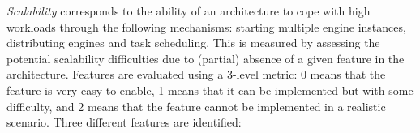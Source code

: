 \documentclass[preprint,3p,twocolumn]{elsarticle}
\newcommand{\note}[2]{\pdfmargincomment[color=yellow,author=#1,open=true]{#2}}
\newcommand{\closednote}[4]{} %
\begin{document}
\emph{Scalability} corresponds to the ability of an architecture to
cope with high workloads through the following mechanisms: starting multiple engine instances, distributing engines and task scheduling. 
This is measured by assessing the potential
scalability difficulties due to (partial) absence of a given feature in the architecture.  
Features are evaluated using a 3-level metric: 0 means that
the feature is very easy to enable, 1 means that it can be implemented
but with some difficulty, and 2 means that the feature cannot
 be implemented in a realistic scenario. \closednote{Naj}{how do you metricize
  "nonesensical amount fo effors?"}{Tristan}{You don't :) Rephrased to
  'cannot realistically be implemented'. At some point it's a matter
  of common sense and experience to draw the line between what is
  easily implemented and what is more tricky. I would like to avoid
  'impossible' because nothing is impossible to implement if enough
  effort is put.} Three different features are identified:
\end{document}
